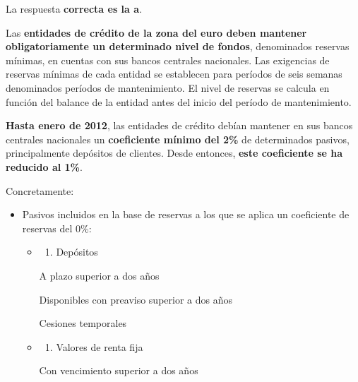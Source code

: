 \documentclass[
  letterpaper,
  DIV=11,
  numbers=noendperiod]{scrreprt}
\providecommand{\tightlist}{%
  \setlength{\itemsep}{0pt}\setlength{\parskip}{0pt}}\usepackage{longtable,booktabs,array}
\begin{document}
\begin{tcolorbox}[enhanced jigsaw, left=2mm, opacityback=0, colback=white, breakable, arc=.35mm, bottomrule=.15mm, rightrule=.15mm, toprule=.15mm, leftrule=.75mm, colframe=quarto-callout-tip-color-frame]
\begin{minipage}[t]{5.5mm}
\textcolor{quarto-callout-tip-color}{\faLightbulb}
\end{minipage}%
\begin{minipage}[t]{\textwidth - 5.5mm}

La respuesta \textbf{correcta es la a}.

Las \textbf{entidades de crédito de la zona del euro deben mantener
obligatoriamente un determinado nivel de fondos}, denominados reservas
mínimas, en cuentas con sus bancos centrales nacionales. Las exigencias
de reservas mínimas de cada entidad se establecen para períodos de seis
semanas denominados períodos de mantenimiento. El nivel de reservas se
calcula en función del balance de la entidad antes del inicio del
período de mantenimiento.

\textbf{Hasta enero de 2012}, las entidades de crédito debían mantener
en sus bancos centrales nacionales un \textbf{coeficiente mínimo del
2\%} de determinados pasivos, principalmente depósitos de clientes.
Desde entonces, \textbf{este coeficiente se ha reducido al 1\%}.

Concretamente:

\begin{itemize}
\item
  Pasivos incluidos en la base de reservas a los que se aplica un
  coeficiente de reservas del 0\%:

  \begin{itemize}
  \item
    \begin{enumerate}
    \def\labelenumi{\arabic{enumi}.}
    \tightlist
    \item
      Depósitos
    \end{enumerate}

    A plazo superior a dos años

    Disponibles con preaviso superior a dos años

    Cesiones temporales
  \item
    \begin{enumerate}
    \def\labelenumi{\arabic{enumi}.}
    \setcounter{enumi}{1}
    \tightlist
    \item
      Valores de renta fija
    \end{enumerate}

    Con vencimiento superior a dos años
  \end{itemize}
\end{itemize}

\end{minipage}%
\end{tcolorbox}
\end{document}
